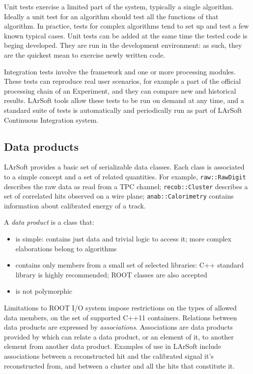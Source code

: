 Unit tests exercise a limited part of the system, typically a single algorithm.
Ideally a unit test for an algorithm should test all the functions of that algorithm.
In practice, tests for complex algorithms tend to set up and test a few known typical cases.
Unit tests can be added at the same time the tested code is beging developed.
They are run in the development environment:
as such, they are the quickest mean to exercise newly written code.

Integration tests involve the framework and one or more processing modules.
These tests can reproduce real user scenarios,
for example a part of the official processing chain of an Experiment,
and they can compare new and historical results.
LArSoft tools allow these tests to be run on demand at any time,
and a standard suite of tests is automatically and periodically run
as part of LArSoft Continuous Integration system.


\subsection{Data products}
\label{ssec:Development:DataProducts}

LArSoft provides a basic set of serializable data classes.
Each class is associated to a simple concept and a set of related quantities.
For example, \texttt{raw::RawDigit} describes the raw data as read from a TPC channel;
\texttt{recob::Cluster} describes a set of correlated hits observed on a wire plane;
\texttt{anab::Calorimetry} contains information about calibrated energy of a track.

A \emph{data product} is a class that:
\begin{itemize}
   \item is simple: contains just data and trivial logic to access it;
      more complex elaborations belong to algorithms
   \item contains only members from a small set of selected libraries:
      C++ standard library is highly recommended; ROOT classes are also accepted
   \item is not polymorphic
\end{itemize}

Limitations to ROOT I/O system impose restrictions on the types of allowed data members,
\eg on the set of supported C++11 containers.
Relations between data products are expressed by \emph{associations}.
Associations are data products provided by \ART
which can relate a data product, or an element of it,
to another element from another data product.
Examples of use in LArSoft include associations between a
reconstructed hit and the calibrated signal it's reconstructed from, and
between a cluster and all the hits that constitute it.

